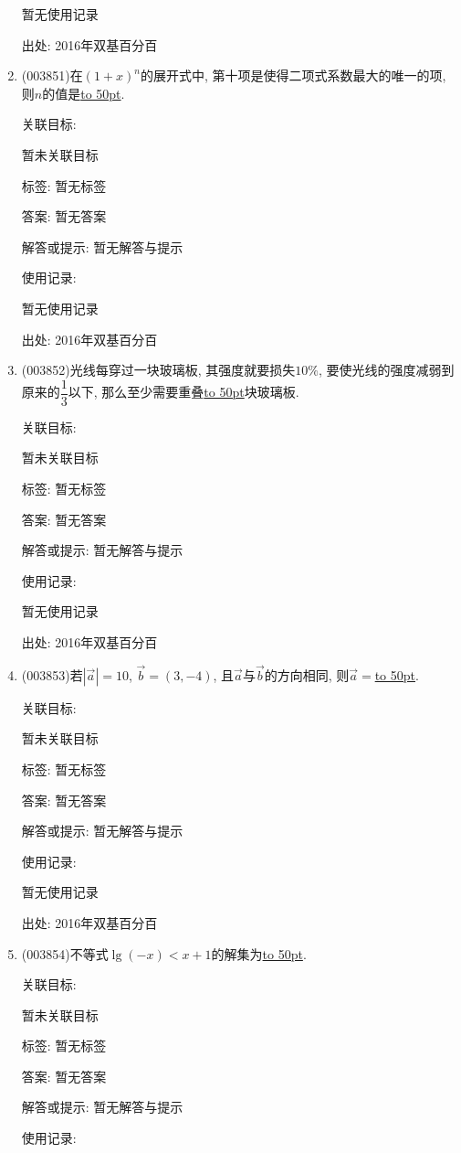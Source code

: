 \documentclass[10pt,a4paper]{article}
\newcommand{\blank}[1]{\underline{\hbox to #1pt{}}}
\begin{document}
\begin{enumerate}[1.]
暂无使用记录


出处: 2016年双基百分百
\item { (003851)}在$(1+x)^n$的展开式中, 第十项是使得二项式系数最大的唯一的项, 则$n$的值是\blank{50}.


关联目标:

暂未关联目标



标签: 暂无标签

答案: 暂无答案

解答或提示: 暂无解答与提示

使用记录:

暂无使用记录


出处: 2016年双基百分百
\item { (003852)}光线每穿过一块玻璃板, 其强度就要损失$10\%$, 要使光线的强度减弱到原来的$\dfrac 13$以下, 那么至少需要重叠\blank{50}块玻璃板.


关联目标:

暂未关联目标



标签: 暂无标签

答案: 暂无答案

解答或提示: 暂无解答与提示

使用记录:

暂无使用记录


出处: 2016年双基百分百
\item { (003853)}若$|\overrightarrow a|=10$, $\overrightarrow b=(3,-4)$, 且$\overrightarrow a$与$\overrightarrow b$的方向相同, 则$\overrightarrow a=$\blank{50}.


关联目标:

暂未关联目标



标签: 暂无标签

答案: 暂无答案

解答或提示: 暂无解答与提示

使用记录:

暂无使用记录


出处: 2016年双基百分百
\item { (003854)}不等式$\lg(-x)<x+1$的解集为\blank{50}.


关联目标:

暂未关联目标



标签: 暂无标签

答案: 暂无答案

解答或提示: 暂无解答与提示

使用记录:


\end{enumerate}
\end{document}
